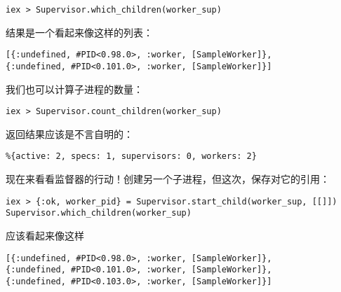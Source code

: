 \begin{code}{}
\begin{verbatim}
iex > Supervisor.which_children(worker_sup)
\end{verbatim}
\end{code}

结果是一个看起来像这样的列表：

\begin{code}{}
\begin{verbatim}
[{:undefined, #PID<0.98.0>, :worker, [SampleWorker]},
{:undefined, #PID<0.101.0>, :worker, [SampleWorker]}]
\end{verbatim}
\end{code}

我们也可以计算子进程的数量：

\begin{code}{}
\begin{verbatim}
iex > Supervisor.count_children(worker_sup)
\end{verbatim}
\end{code}

返回结果应该是不言自明的：

\begin{code}{}
\begin{verbatim}
%{active: 2, specs: 1, supervisors: 0, workers: 2}
\end{verbatim}
\end{code}

现在来看看监督器的行动！创建另一个子进程，但这次，保存对它的引用：

\begin{code}{}
\begin{verbatim}
iex > {:ok, worker_pid} = Supervisor.start_child(worker_sup, [[]])
Supervisor.which_children(worker_sup)
\end{verbatim}
\end{code}

应该看起来像这样

\begin{code}{}
\begin{verbatim}
[{:undefined, #PID<0.98.0>, :worker, [SampleWorker]},
{:undefined, #PID<0.101.0>, :worker, [SampleWorker]},
{:undefined, #PID<0.103.0>, :worker, [SampleWorker]}]
\end{verbatim}
\end{code}

